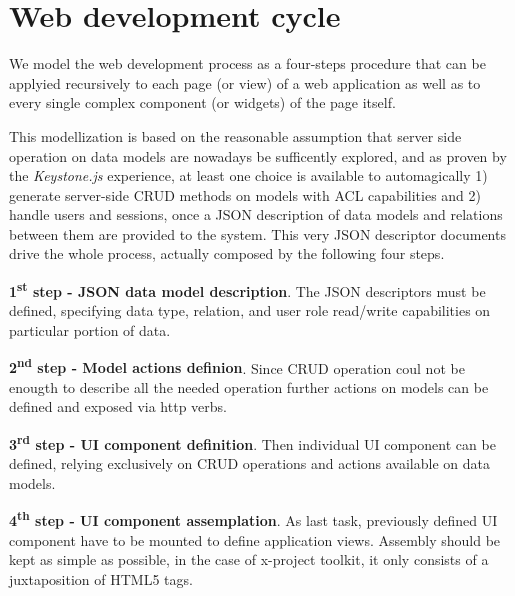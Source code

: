 \section{Web development cycle}

We model the web development process as a four-steps procedure that can be
applyied recursively to each page (or view) of a web application as well as to
every single complex component (or widgets) of the page itself.

This modellization is based on the reasonable assumption that server side
operation on data models are nowadays be sufficently explored, and as proven by
the {\em Keystone.js} experience, at least one choice is available to automagically  
1) generate server-side CRUD methods on models with ACL capabilities and 
2) handle users and sessions, 
once a JSON description of data models and relations between them are provided to the
system. This very JSON descriptor documents drive the whole process, actually composed
by the following four steps.


{\bf 1\textsuperscript{st} step - JSON data model description}. The JSON
descriptors must be defined, specifying data type, relation, and user role
read/write capabilities on particular portion of data.

{\bf 2\textsuperscript{nd} step - Model actions definion}. Since CRUD
operation coul not be enougth to describe all the needed operation further
actions on models can be defined and exposed via http verbs.

{\bf 3\textsuperscript{rd} step - UI component definition}. Then individual UI
component can be defined,  relying exclusively on CRUD operations and actions
available on data models.

{\bf 4\textsuperscript{th} step - UI component assemplation}. As last task,
previously defined UI component  have to be mounted to define application
views. Assembly should be kept as simple as possible, in the case of x-project
toolkit, it only consists of a juxtaposition of HTML5 tags.




